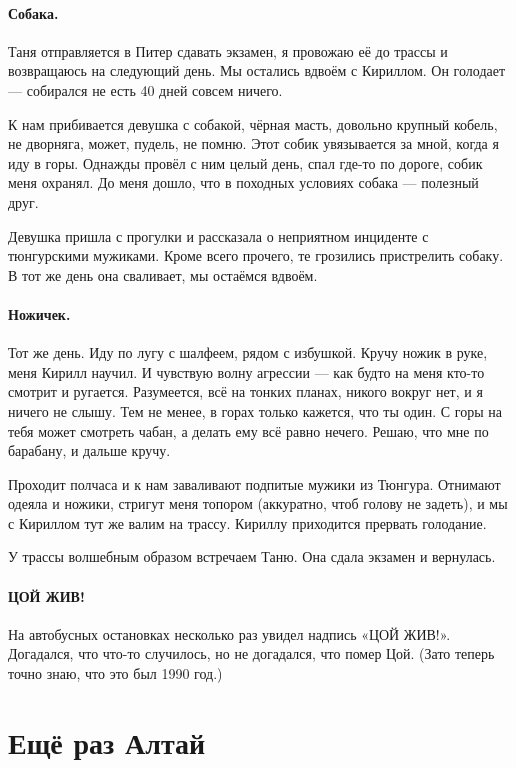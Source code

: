 \documentclass{book}
\begin{document}
\paragraph{Собака.}
Таня отправляется в Питер сдавать экзамен, я провожаю её до трассы и возвращаюсь на следующий день.
Мы остались вдвоём с Кириллом.
Он голодает --- собирался не есть 40 дней совсем ничего.

К нам прибивается девушка с собакой, чёрная масть, довольно крупный кобель, не дворняга, может, пудель, не помню.
Этот собик увязывается за мной, когда я иду в горы.
Однажды провёл с ним целый день, спал где-то по дороге, собик меня охранял.
До меня дошло, что в походных условиях собака --- полезный друг.

Девушка пришла с прогулки и рассказала о неприятном инциденте с тюнгурскими мужиками.
Кроме всего прочего, те грозились пристрелить собаку.
В тот же день она сваливает, мы остаёмся вдвоём.

\paragraph{Ножичек.}
Тот же день.
Иду по лугу с шалфеем, рядом с избушкой.
Кручу ножик в руке, меня Кирилл научил.
И чувствую волну агрессии --- как будто на меня кто-то смотрит и ругается.
Разумеется, всё на тонких планах, никого вокруг нет, и я ничего не слышу.
Тем не менее, в горах только кажется, что ты один.
С горы на тебя может смотреть чабан, а делать ему всё равно нечего.
Решаю, что мне по барабану, и дальше кручу.

Проходит полчаса и к нам заваливают подпитые мужики из Тюнгура.
Отнимают одеяла и ножики, стригут меня топором (аккуратно, чтоб голову не задеть), и мы с Кириллом тут же валим на трассу.
Кириллу приходится прервать голодание.

У трассы волшебным образом встречаем Таню.
Она сдала экзамен и вернулась.

\paragraph{ЦОЙ ЖИВ!}
На автобусных остановках несколько раз увидел надпись «ЦОЙ ЖИВ!».
Догадался, что что-то случилось, но не догадался, что помер Цой.
(Зато теперь точно знаю, что это был 1990 год.)

\section*{Ещё раз Алтай}
\end{document}
